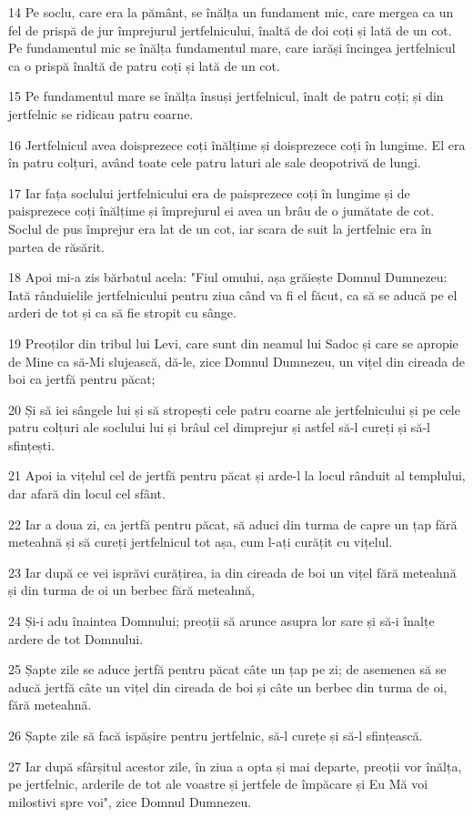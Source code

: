 \par 14 Pe soclu, care era la pământ, se înălța un fundament mic, care mergea ca un fel de prispă de jur împrejurul jertfelnicului, înaltă de doi coți și lată de un cot. Pe fundamentul mic se înălța fundamentul mare, care iarăși încingea jertfelnicul ca o prispă înaltă de patru coți și lată de un cot.
\par 15 Pe fundamentul mare se înălța însuși jertfelnicul, înalt de patru coți; și din jertfelnic se ridicau patru coarne.
\par 16 Jertfelnicul avea doisprezece coți înălțime și doisprezece coți în lungime. El era în patru colțuri, având toate cele patru laturi ale sale deopotrivă de lungi.
\par 17 Iar fața soclului jertfelnicului era de paisprezece coți în lungime și de paisprezece coți înălțime și împrejurul ei avea un brâu de o jumătate de cot. Soclul de pus împrejur era lat de un cot, iar scara de suit la jertfelnic era în partea de răsărit.
\par 18 Apoi mi-a zis bărbatul acela: "Fiul omului, așa grăiește Domnul Dumnezeu: Iată rânduielile jertfelnicului pentru ziua când va fi el făcut, ca să se aducă pe el arderi de tot și ca să fie stropit cu sânge.
\par 19 Preoților din tribul lui Levi, care sunt din neamul lui Sadoc și care se apropie de Mine ca să-Mi slujească, dă-le, zice Domnul Dumnezeu, un vițel din cireada de boi ca jertfă pentru păcat;
\par 20 Și să iei sângele lui și să stropești cele patru coarne ale jertfelnicului și pe cele patru colțuri ale soclului lui și brâul cel dimprejur și astfel să-l cureți și să-l sfințești.
\par 21 Apoi ia vițelul cel de jertfă pentru păcat și arde-l la locul rânduit al templului, dar afară din locul cel sfânt.
\par 22 Iar a doua zi, ca jertfă pentru păcat, să aduci din turma de capre un țap fără meteahnă și să cureți jertfelnicul tot așa, cum l-ați curățit cu vițelul.
\par 23 Iar după ce vei isprăvi curățirea, ia din cireada de boi un vițel fără meteahnă și din turma de oi un berbec fără meteahnă,
\par 24 Și-i adu înaintea Domnului; preoții să arunce asupra lor sare și să-i înalțe ardere de tot Domnului.
\par 25 Șapte zile se aduce jertfă pentru păcat câte un țap pe zi; de asemenea să se aducă jertfă câte un vițel din cireada de boi și câte un berbec din turma de oi, fără meteahnă.
\par 26 Șapte zile să facă ispășire pentru jertfelnic, să-l curețe și să-l sfințească.
\par 27 Iar după sfârșitul acestor zile, în ziua a opta și mai departe, preoții vor înălța, pe jertfelnic, arderile de tot ale voastre și jertfele de împăcare și Eu Mă voi milostivi spre voi", zice Domnul Dumnezeu.

